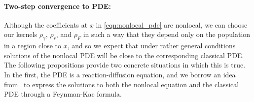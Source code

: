 \documentclass[12pt]{article}
\newcommand{\grad}{\nabla}
\newcommand{\DG}{\mathcal{B}}  %
\newcommand{\meanq}{\vec b}    %
\numberwithin{equation}{section}
\begin{document}

\paragraph{Two-step convergence to PDE:}
Although the coefficients at $x$ in \eqref{eqn:nonlocal_pde} are nonlocal,
we can choose our kernels $\rho_\gamma$, $\rho_r$, and $\rho_F$
in such a way that they depend only on the population in a region close to $x$,
and so we expect that under rather general conditions
solutions of the nonlocal PDE will be close to the corresponding 
classical PDE.
The following propositions provide two concrete situations in which this is true.
In the first, the PDE is a reaction-diffusion equation, and we borrow
an idea from~\cite{penington:2017} to express the solutions to both the nonlocal
equation and the classical PDE through a Feynman-Kac formula. 
\end{document}

